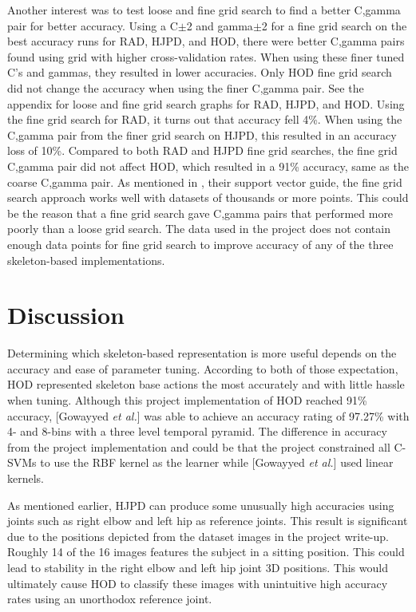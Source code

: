 \documentclass[11pt,nocopyrightspace]{config}
\begin{document}
Another interest was to test loose and fine grid search to find a better C,gamma pair for better accuracy. Using a C$\pm$2 and gamma$\pm$2 for a fine grid search on the best accuracy runs for RAD, HJPD, and HOD, there were better C,gamma pairs found using grid with higher cross-validation rates. When using these finer tuned C's and gammas, they resulted in lower accuracies. Only HOD fine grid search did not change the accuracy when using the finer C,gamma pair. See the appendix for loose and fine grid search graphs for RAD, HJPD, and HOD. Using the fine grid search for RAD, it turns out that accuracy fell 4\%. When using the C,gamma pair from the finer grid search on HJPD, this resulted in an accuracy loss of 10\%. Compared to both RAD and HJPD fine grid searches, the fine grid C,gamma pair did not affect HOD, which resulted in a 91\% accuracy, same as the coarse C,gamma pair. As mentioned in \cite{guide}, their support vector guide, the fine grid search approach works well with datasets of thousands or more points. This could be the reason that a fine grid search gave C,gamma pairs that performed more poorly than a loose grid search. The data used in the project does not contain enough data points for fine grid search to improve accuracy of any of the three skeleton-based implementations.

\section{Discussion}

Determining which skeleton-based representation is more useful depends on the accuracy and ease of parameter tuning. According to both of those expectation, HOD represented skeleton base actions the most accurately and with little hassle when tuning. Although this project implementation of HOD reached 91\% accuracy, [Gowayyed \textit{et al.}] was able to achieve an accuracy rating of 97.27\% with 4- and 8-bins with a three level temporal pyramid. The difference in accuracy from the project implementation and \cite{hodPaper} could be that the project constrained all C-SVMs to use the RBF kernel as the learner while [Gowayyed \textit{et al.}] used linear kernels.

As mentioned earlier, HJPD can produce some unusually high accuracies using joints such as right elbow and left hip as reference joints. This result is significant due to the positions depicted from the dataset images in the project write-up. Roughly 14 of the 16 images features the subject in a sitting position. This could lead to stability in the right elbow and left hip joint 3D positions. This would ultimately cause HOD to classify these images with unintuitive high accuracy rates using an unorthodox reference joint.
\end{document}
